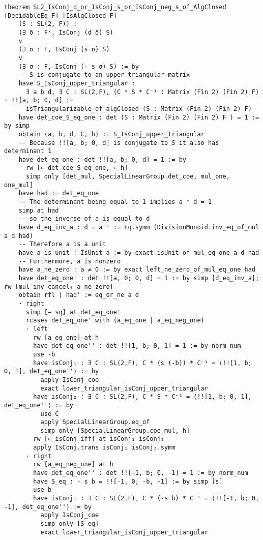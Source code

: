 \begin{footnotesize}
\begin{verbatim}
theorem SL2_IsConj_d_or_IsConj_s_or_IsConj_neg_s_of_AlgClosed [DecidableEq F] [IsAlgClosed F]
    (S : SL(2, F)) :
    (∃ δ : Fˣ, IsConj (d δ) S)
    ∨
    (∃ σ : F, IsConj (s σ) S)
    ∨
    (∃ σ : F, IsConj (- s σ) S) := by
    -- S is conjugate to an upper triangular matrix
    have S_IsConj_upper_triangular :
      ∃ a b d, ∃ C : SL(2,F), (C * S * C⁻¹ : Matrix (Fin 2) (Fin 2) F) = !![a, b; 0, d] :=
      isTriangularizable_of_algClosed (S : Matrix (Fin 2) (Fin 2) F)
    have det_coe_S_eq_one : det (S : Matrix (Fin 2) (Fin 2) F ) = 1 := by simp
    obtain ⟨a, b, d, C, h⟩ := S_IsConj_upper_triangular
    -- Because !![a, b; 0, d] is conjugate to S it also has determinant 1
    have det_eq_one : det !![a, b; 0, d] = 1 := by
      rw [← det_coe_S_eq_one, ← h]
      simp only [det_mul, SpecialLinearGroup.det_coe, mul_one, one_mul]
    have had := det_eq_one
    -- The determinant being equal to 1 implies a * d = 1
    simp at had
    -- so the inverse of a is equal to d
    have d_eq_inv_a : d = a⁻¹ := Eq.symm (DivisionMonoid.inv_eq_of_mul a d had)
    -- Therefore a is a unit
    have a_is_unit : IsUnit a := by exact isUnit_of_mul_eq_one a d had
    -- Furthermore, a is nonzero
    have a_ne_zero : a ≠ 0 := by exact left_ne_zero_of_mul_eq_one had
    have det_eq_one' : det !![a, 0; 0, d] = 1 := by simp [d_eq_inv_a]; rw [mul_inv_cancel₀ a_ne_zero]
    obtain rfl | had' := eq_or_ne a d
    · right
      simp [← sq] at det_eq_one'
      rcases det_eq_one' with (a_eq_one | a_eq_neg_one)
      · left
        rw [a_eq_one] at h
        have det_eq_one'' : det !![1, b; 0, 1] = 1 := by norm_num
        use -b
        have isConj₁ : ∃ C : SL(2,F), C * (s (-b)) * C⁻¹ = ⟨!![1, b; 0, 1], det_eq_one''⟩ := by
          apply IsConj_coe
          exact lower_triangular_isConj_upper_triangular
        have isConj₂ : ∃ C : SL(2,F), C * S * C⁻¹ = ⟨!![1, b; 0, 1], det_eq_one''⟩ := by
          use C
          apply SpecialLinearGroup.eq_of
          simp only [SpecialLinearGroup.coe_mul, h]
        rw [← isConj_iff] at isConj₁ isConj₂
        apply IsConj.trans isConj₁ isConj₂.symm
      · right
        rw [a_eq_neg_one] at h
        have det_eq_one'' : det !![-1, b; 0, -1] = 1 := by norm_num
        have S_eq : - s b = !![-1, 0; -b, -1] := by simp [s]
        use b
        have isConj₁ : ∃ C : SL(2,F), C * (-s b) * C⁻¹ = ⟨!![-1, b; 0, -1], det_eq_one''⟩ := by
          apply IsConj_coe
          simp only [S_eq]
          exact lower_triangular_isConj_upper_triangular

\end{verbatim}
\end{footnotesize}
